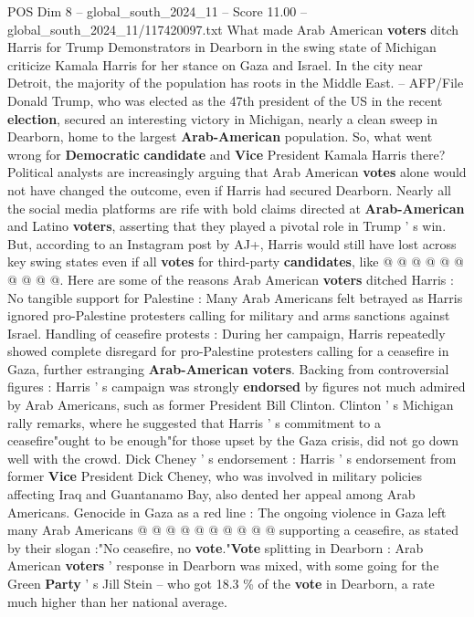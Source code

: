 \begin{textsample}{POS Dim 8 – global\_south\_2024\_11 – Score 11.00 – global\_south\_2024\_11/117420097.txt}  \label{ex:f8_pos_143}
What made Arab American \textbf{voters} ditch Harris for Trump Demonstrators in Dearborn in the swing state of Michigan criticize Kamala Harris for her stance on Gaza and Israel.
In the city near Detroit, the majority of the population has roots in the Middle East. -- AFP/File Donald Trump, who was elected as the 47th president of the US in the recent \textbf{election}, secured an interesting victory in Michigan, nearly a clean sweep in Dearborn, home to the largest \textbf{Arab-American} population.
So, what went wrong for \textbf{Democratic} \textbf{candidate} and \textbf{Vice} President Kamala Harris there?
Political analysts are increasingly arguing that Arab American \textbf{votes} alone would not have changed the outcome, even if Harris had secured Dearborn.
Nearly all the social media platforms are rife with bold claims directed at \textbf{Arab-American} and Latino \textbf{voters}, asserting that they played a pivotal role in Trump ' s win.
But, according to an Instagram post by AJ+, Harris would still have lost across key swing states even if all \textbf{votes} for third-party \textbf{candidates}, like @ @ @ @ @ @ @ @ @ @.
Here are some of the reasons Arab American \textbf{voters} ditched Harris : No tangible support for Palestine : Many Arab Americans felt betrayed as Harris ignored pro-Palestine protesters calling for military and arms sanctions against Israel.
Handling of ceasefire protests : During her campaign, Harris repeatedly showed complete disregard for pro-Palestine protesters calling for a ceasefire in Gaza, further estranging \textbf{Arab-American} \textbf{voters}.
Backing from controversial figures : Harris ' s campaign was strongly \textbf{endorsed} by figures not much admired by Arab Americans, such as former President Bill Clinton.
Clinton ' s Michigan rally remarks, where he suggested that Harris ' s commitment to a ceasefire"ought to be enough"for those upset by the Gaza crisis, did not go down well with the crowd.
Dick Cheney ' s endorsement : Harris ' s endorsement from former \textbf{Vice} President Dick Cheney, who was involved in military policies affecting Iraq and Guantanamo Bay, also dented her appeal among Arab Americans.
Genocide in Gaza as a red line : The ongoing violence in Gaza left many Arab Americans @ @ @ @ @ @ @ @ @ @ supporting a ceasefire, as stated by their slogan :"No ceasefire, no \textbf{vote}."\textbf{Vote} splitting in Dearborn : Arab American \textbf{voters} ' response in Dearborn was mixed, with some going for the Green \textbf{Party} ' s Jill Stein -- who got 18.3 \% of the \textbf{vote} in Dearborn, a rate much higher than her national average.

\end{textsample}
